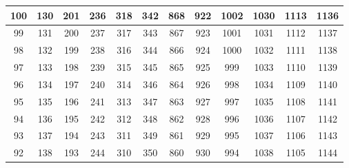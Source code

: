 \begin{center}
{\begin{tabular} {| c | c | c | c | c | c | c | c | c | c | c | c | }
\cellcolor{red!25}100 & 130                      &  201 & 236 & \cellcolor{red!25}318 & \cellcolor{red!25}342 & 868 & \cellcolor{red!25}922 & 1002                      & 1030 & 1113                       & \cellcolor{red!25}1136 \\ \hline
\cellcolor{red!25} 99 & 131                      &  200 & 237 & 317                      & 343                      & 867 & 923                      & 1001                      & 1031 & 1112                       & \cellcolor{red!25}1137 \\ \hline
 98                      & 132                      &  199 & 238 & 316                      & 344                      & 866 & 924                      & 1000                      & 1032 & 1111                       & \cellcolor{red!25}1138 \\ \hline
 97                      & 133                      &  198 & 239 & 315                      & 345                      & 865 & 925                      &  999                      & 1033 & 1110                       & 1139                      \\ \hline
 96                      & 134                      &  197 & 240 & 314                      & 346                      & 864 & 926                      &  998                      & 1034 & 1109                       & 1140                      \\ \hline
 95                      & 135                      &  196 & 241 & 313                      & 347                      & 863 & 927                      &  997                      & 1035 & 1108                       & 1141                      \\ \hline
 94                      & 136                      &  195 & 242 & 312                      & 348                      & 862 & 928                      &  996                      & 1036 & 1107                       & 1142                      \\ \hline
 93                      & 137                      &  194 & 243 & 311                      & 349                      & 861 & 929                      &  995                      & 1037 & 1106                       & 1143                      \\ \hline
 92                      & 138                      &  193 & 244 & 310                      & 350                      & 860 & 930                      &  994                      & 1038 & 1105                       & 1144                      \\ \hline

\end{tabular}}
\end{center}
